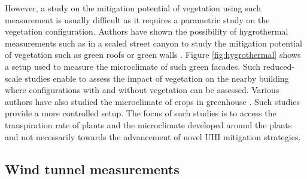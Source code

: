 However, a study on the mitigation potential of vegetation using such measurement is usually difficult as it requires a parametric study on the vegetation configuration. Authors have shown the possibility of hygrothermal measurements such as in a scaled street canyon to study the mitigation potential of vegetation such as green roofs or green walls \citep{Djedjig2015,Malys2014}. Figure \ref{fig:hygrothermal} shows a setup used to measure the microclimate of such green facades. Such reduced-scale studies enable to assess the impact of vegetation on the nearby building where configurations with and without vegetation can be assessed. Various authors have also studied the microclimate of crops in greenhouse \citep{Kichah2012,Baille1994,Roy, Montero2001,Fatnassi2006,Boulard2002}. Such studies provide a more controlled setup. The focus of such studies is to access the transpiration rate of plants and the microclimate developed around the plants and not necessarily towards the advancement of novel UHI mitigation strategies. 

\subsection{Wind tunnel measurements}


